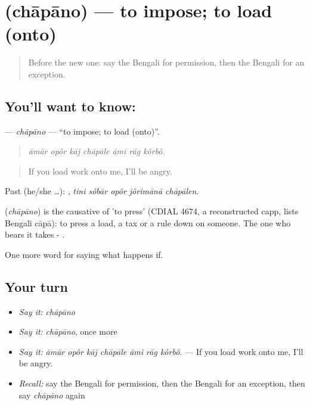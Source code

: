 \section[\texorpdfstring{\bn{চাপানো} (chāpāno)}{চাপানো (chāpāno)}]{ (chāpāno) — to impose; to load (onto)}

\label{lesson:BN-C375-chapano}



\begin{quote}
Before the new one: say the Bengali for permission, then the Bengali for an exception.
\end{quote}

\subsection*{You'll want to know: }
\textbf{} — \emph{chāpāno} — \textquotedblleft{}to impose; to load (onto)\textquotedblright{}.

\begin{quote}
      
\end{quote}

\begin{quote}
\emph{āmār opôr kāj chāpāle āmi rāg kôrbô.}
\end{quote}

\begin{quote}
If you load work onto me, I'll be angry.
\end{quote}

Past (he/she …):     , \emph{tini sôbār opôr jôrimānā chāpālen}.

\begin{cousinweb}
\textbf{} (\emph{chāpāno}) is the causative of  'to press' (CDIAL 4674, a reconstructed capp, lists Bengali cāpā): to press a load, a tax or a rule down on someone. The one who bears it takes - .
\end{cousinweb}

\begin{grammarlens}[title={What you've built}]
One more word for saying what happens if.
\end{grammarlens}

\subsection*{Your turn}
\begin{itemize}
\raggedright
  \item \emph{Say it:} \emph{chāpāno}
  \item \emph{Say it:} \emph{chāpāno}, once more
  \item \emph{Say it:} \emph{āmār opôr kāj chāpāle āmi rāg kôrbô.} — If you load work onto me, I'll be angry.
  \item \emph{Recall:} say the Bengali for permission, then the Bengali for an exception, then say \emph{chāpāno} again
\end{itemize}

